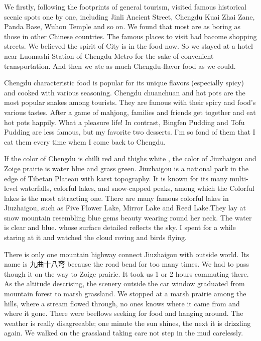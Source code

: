 \documentclass[UTF8]{article}
\begin{document}
We firstly, following the footprints of general tourism, visited famous historical scenic spots one by one, including Jinli Ancient Street, Chengdu Kuai Zhai Zane, Panda Base, Wuhou Temple and so on. We found that most are as boring as those in other Chinese countries. The famous places to visit had bacome shopping streets. We believed the spirit of City is in the food now. So we stayed at a hotel near Luomashi Station of Chengdu Metro for the sake of convenient transportation. And then we ate as much Chengdu-flavor food as we could.

Chengdu characteristic food is popular for its unique flavors (especially spicy) and cooked with various seasoning. Chengdu chuanchuan and hot pots are the most popular snakes among tourists. They are famous with their spicy and food's various tastes. After a game of mahjong, families and friends get together and eat hot pots happily. What a pleasure life! In contrast, Bingfen Pudding and Tofu Pudding are less famous, but my favorite two desserts. I'm so fond of them that I eat them every time whem I come back to Chengdu. 

If the color of Chengdu is chilli red and thighs white , the color of Jiuzhaigou and Zoige prairie is water blue and grass green.
Jiuzhaigou is a national park in the edge of Tibetan Plateau with karst topography. It is known for its many multi-level waterfalls, colorful lakes, and snow-capped peaks, among which the Colorful lakes is  the most attracting one. There are many famous colorful lakes in Jiuzhaigou, such as  Five Flower Lake, Mirror Lake and Reed Lake.They lay at snow mountain resembling  blue gems beauty wearing round her neck. The water is clear and blue. whose surface detailed reflects the sky. I spent for a while staring at it and watched the cloud roving and birds flying. 

There is only one mountain highway connect Jiuzhaigou with outside  world. Its name is 九曲十八弯 because the road bend for too many times.
We had to pass though it on the way to Zoige prairie. It took us 1 or 2  hours commuting there. As the altitude descrising, the scenery outside the car window graduated from mountain forest to marsh grassland.  We stopped at a marsh prairie among the hills, where a stream flowed through, no ones knows where it came from and where it gone. There were beeflows seeking for food and hanging around. The weather is really disagreeable; one minute the sun shines, the next it is drizzling again.  We walked on the grassland taking care not step in the mud carelessly.
\end{document}
